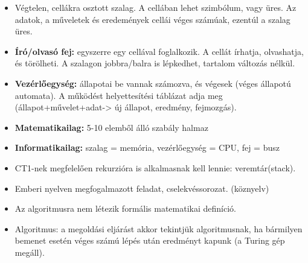 \documentclass[11pt,a4paper]{article}
\begin{document}
            \begin{tcolorbox}[colback=blue!5!white,colframe=blue!50!black,title= 3. Ismertesse a Turing-gép felépítését és működését!]
            \begin{itemize}
                \item Végtelen, cellákra osztott szalag. A cellában lehet szimbólum, vagy üres. Az adatok, a műveletek és eredemények cellái véges számúak, ezentúl a szalag üres.
                \item \textbf{Író/olvasó fej:} egyszerre egy cellával foglalkozik. A cellát írhatja, olvashatja, és törölheti. A szalagon jobbra/balra is lépkedhet, tartalom változás nélkül.
                \item \textbf{Vezérlőegység:} állapotai be vannak számozva, és végesek (véges állapotú automata). A működést helyettesítési táblázat adja meg (állapot+művelet+adat-> új állapot, eredmény, fejmozgás).
                \item \textbf{Matematikailag:} 5-10 elemből álló szabály halmaz
                \item \textbf{Informatikailag:} szalag = memória, vezérlőegység = CPU, fej = busz
                \item CT1-nek megfelelően rekurzióra is alkalmasnak kell lennie: veremtár(stack).
            \end{itemize}
            \end{tcolorbox}

            \begin{tcolorbox}[colback=blue!5!white,colframe=blue!50!black,title= 4. Ismertesse az algoritmus köznyelvi és matematikai és Turing-géppel megfogalmazott definícióját!]
                \begin{itemize}
                    \item Emberi nyelven megfogalmazott feladat, cselekvéssorozat. (köznyelv)
                    \item Az algoritmusra nem létezik formális matematikai definíció.
                    \item Algoritmus: a megoldási eljárást akkor tekintjük algoritmusnak, ha bármilyen bemenet esetén véges számú lépés után eredményt kapunk (a Turing gép megáll).
                \end{itemize}
            \end{tcolorbox}
\end{document}
